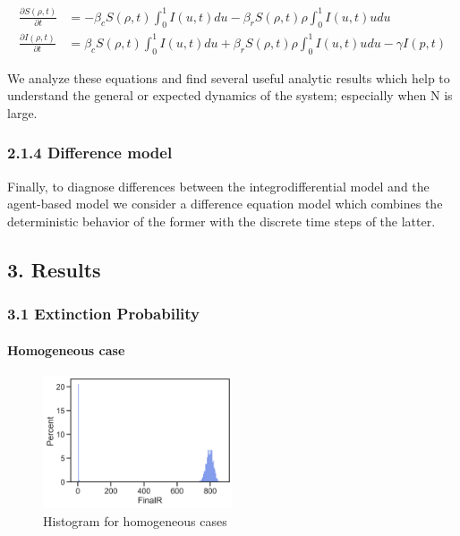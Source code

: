 \[
\begin{aligned}
\frac{\partial S(\rho, t)}{\partial t} &=
    -\beta_c S(\rho, t) \int_{0}^1 I(u, t) du
    -\beta_r S(\rho, t) \rho \int_{0}^1 I(u, t) u du\\
\frac{\partial I(\rho, t)}{\partial t} &=
    \beta_c S(\rho, t) \int_{0}^1 I(u, t) du
    + \beta_r S(\rho, t) \rho \int_{0}^1 I(u, t) u du - \gamma I(p, t)
\end{aligned}
\]

We analyze these equations and find several useful analytic results
which help to understand the general or expected dynamics of the system;
especially when N is large.

\subsubsection{2.1.4 Difference model}\label{difference-model}

Finally, to diagnose differences between the integrodifferential model
and the agent-based model we consider a difference equation model which
combines the deterministic behavior of the former with the discrete time
steps of the latter.

\subsection{3. Results}\label{results}

\subsubsection{3.1 Extinction Probability}\label{extinction-probability}

\paragraph{Homogeneous case}\label{homogeneous-case}

\begin{figure}
\centering
\includegraphics[width=0.5\textwidth,height=\textheight]{images/R2_histogram.png}
\caption{Histogram for homogeneous cases}
\end{figure}


